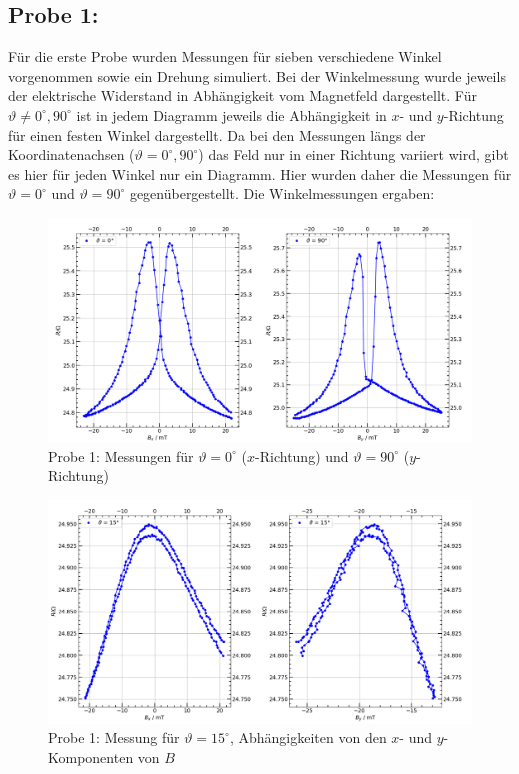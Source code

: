 \documentclass[german,  %
parskip=full,  %
]{scrartcl}
\begin{document}
\subsection{Probe 1:}
Für die erste Probe wurden Messungen für sieben verschiedene Winkel vorgenommen sowie ein Drehung simuliert. Bei der Winkelmessung wurde jeweils der elektrische Widerstand in Abhängigkeit vom Magnetfeld dargestellt. Für \(\vartheta\neq 0^{\circ},90^{\circ}\) ist in jedem Diagramm jeweils die Abhängigkeit in \(x\)- und \(y\)-Richtung für einen festen Winkel dargestellt. Da bei den Messungen längs der Koordinatenachsen (\(\vartheta = 0^{\circ},90^{\circ}\)) das Feld nur in einer Richtung variiert wird, gibt es hier für jeden Winkel nur ein Diagramm. Hier wurden daher die Messungen für  \(\vartheta = 0^{\circ}\) und \(\vartheta = 90^{\circ}\) gegenübergestellt. Die Winkelmessungen ergaben:
\newpage
\begin{figure}[h!]\centering
\includegraphics[width=\textwidth]{Probe1_0_und_90_Grad.png}
\caption{Probe 1: Messungen für \(\vartheta=0^{\circ}\) (\(x\)-Richtung) und \(\vartheta=90^{\circ}\) (\(y\)-Richtung)}
\end{figure} 
\begin{figure}[h!]\centering
\includegraphics[width=\textwidth]{Probe1_15_Grad.png}
\caption{Probe 1: Messung für \(\vartheta=15^{\circ}\), Abhängigkeiten von den \(x\)- und \(y\)-Komponenten von \(B\)}
\end{figure} 
\end{document}
